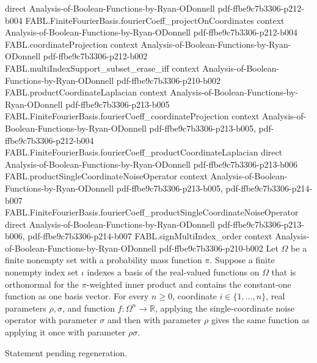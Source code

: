 \begin{theorem}
  {direct}
  {Analysis-of-Boolean-Functions-by-Ryan-ODonnell}
  {pdf-ffbe9c7b3306-p212-b004}
\proofstep
  {FABL.FiniteFourierBasis.fourierCoeff_projectOnCoordinates}
  {context}
  {Analysis-of-Boolean-Functions-by-Ryan-ODonnell}
  {pdf-ffbe9c7b3306-p212-b004}
\proofstep
  {FABL.coordinateProjection}
  {context}
  {Analysis-of-Boolean-Functions-by-Ryan-ODonnell}
  {pdf-ffbe9c7b3306-p212-b002}
\proofstep
  {FABL.multiIndexSupport_subset_erase_iff}
  {context}
  {Analysis-of-Boolean-Functions-by-Ryan-ODonnell}
  {pdf-ffbe9c7b3306-p210-b002}
\proofstep
  {FABL.productCoordinateLaplacian}
  {context}
  {Analysis-of-Boolean-Functions-by-Ryan-ODonnell}
  {pdf-ffbe9c7b3306-p213-b005}
\proofstep
  {FABL.FiniteFourierBasis.fourierCoeff_coordinateProjection}
  {context}
  {Analysis-of-Boolean-Functions-by-Ryan-ODonnell}
  {pdf-ffbe9c7b3306-p213-b005,
    pdf-ffbe9c7b3306-p212-b004}
\proofstep
  {FABL.FiniteFourierBasis.fourierCoeff_productCoordinateLaplacian}
  {direct}
  {Analysis-of-Boolean-Functions-by-Ryan-ODonnell}
  {pdf-ffbe9c7b3306-p213-b006}
\proofstep
  {FABL.productSingleCoordinateNoiseOperator}
  {context}
  {Analysis-of-Boolean-Functions-by-Ryan-ODonnell}
  {pdf-ffbe9c7b3306-p213-b005,
    pdf-ffbe9c7b3306-p214-b007}
\proofstep
  {FABL.FiniteFourierBasis.fourierCoeff_productSingleCoordinateNoiseOperator}
  {direct}
  {Analysis-of-Boolean-Functions-by-Ryan-ODonnell}
  {pdf-ffbe9c7b3306-p213-b006,
    pdf-ffbe9c7b3306-p214-b007}
\proofstep
  {FABL.signMultiIndex_order}
  {context}
  {Analysis-of-Boolean-Functions-by-Ryan-ODonnell}
  {pdf-ffbe9c7b3306-p210-b002}
Let $\Omega$ be a finite nonempty set with a probability mass function $\pi$. Suppose a
finite nonempty index set $\iota$ indexes a basis of the real-valued functions on
$\Omega$ that is orthonormal for the $\pi$-weighted inner product and contains the
constant-one function as one basis vector. For every $n\ge 0$, coordinate
$i\in\{1,\ldots,n\}$, real parameters $\rho,\sigma$, and function
$f:\Omega^n\to\mathbb{R}$, applying the single-coordinate noise operator with parameter
$\sigma$ and then with parameter $\rho$ gives the same function as applying it once with
parameter $\rho\sigma$.
\end{theorem}

\begin{theorem}
\label{FABL.productSingleCoordinateNoiseOperator_comm}
\leanok
{}
Statement pending regeneration.
\end{theorem}

